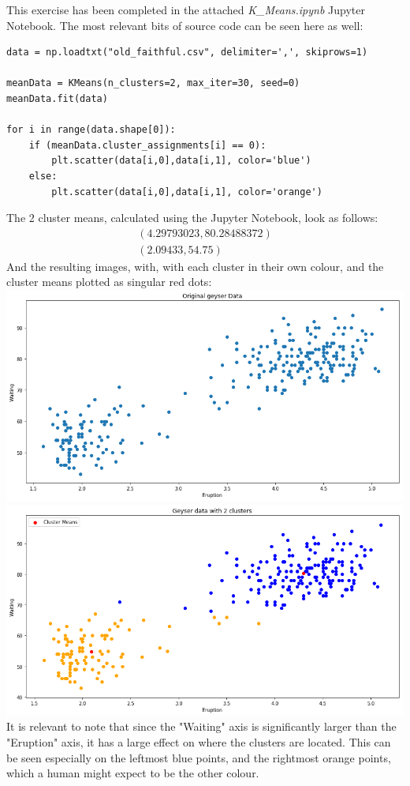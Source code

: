 This exercise has been completed in the attached \textit{K\_Means.ipynb} Jupyter Notebook. The most relevant bits of source code can be seen here as well:
\begin{verbatim}
data = np.loadtxt("old_faithful.csv", delimiter=',', skiprows=1)

meanData = KMeans(n_clusters=2, max_iter=30, seed=0)
meanData.fit(data)

for i in range(data.shape[0]):
    if (meanData.cluster_assignments[i] == 0):
        plt.scatter(data[i,0],data[i,1], color='blue')
    else:
        plt.scatter(data[i,0],data[i,1], color='orange')
\end{verbatim}
The 2 cluster means, calculated using the Jupyter Notebook, look as follows:
$$
\begin{matrix}
(4.29793023,80.28488372) \\
(2.09433,54.75)
\end{matrix}
$$
And the resulting images, with, with each cluster in their own colour, and the cluster means plotted as singular red dots:\\
\includegraphics[width=\linewidth]{3a1.png}\\
\includegraphics[width=\linewidth]{3a2.png}\\
It is relevant to note that since the "Waiting" axis is significantly larger than the "Eruption" axis, it has a large effect on where the clusters are located. This can be seen especially on the leftmost blue points, and the rightmost orange points, which a human might expect to be the other colour.